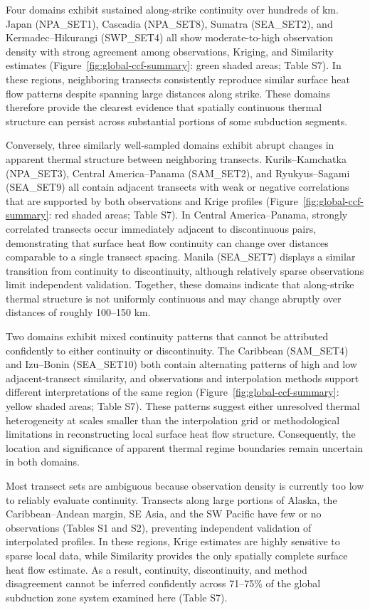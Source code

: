 \documentclass[draft,linenumbers]{agujournal2019}
\begin{document}
Four domains exhibit sustained along-strike continuity over hundreds of
km. Japan (NPA\_SET1), Cascadia (NPA\_SET8), Sumatra (SEA\_SET2), and
Kermadec--Hikurangi (SWP\_SET4) all show moderate-to-high observation
density with strong agreement among observations, Kriging, and
Similarity estimates (Figure~\ref{fig:global-ccf-summary}: green shaded
areas; Table S7). In these regions, neighboring transects consistently
reproduce similar surface heat flow patterns despite spanning large
distances along strike. These domains therefore provide the clearest
evidence that spatially continuous thermal structure can persist across
substantial portions of some subduction segments.

Conversely, three similarly well-sampled domains exhibit abrupt changes
in apparent thermal structure between neighboring transects.
Kurils--Kamchatka (NPA\_SET3), Central America--Panama (SAM\_SET2), and
Ryukyus--Sagami (SEA\_SET9) all contain adjacent transects with weak or
negative correlations that are supported by both observations and Krige
profiles (Figure~\ref{fig:global-ccf-summary}: red shaded areas; Table
S7). In Central America--Panama, strongly correlated transects occur
immediately adjacent to discontinuous pairs, demonstrating that surface
heat flow continuity can change over distances comparable to a single
transect spacing. Manila (SEA\_SET7) displays a similar transition from
continuity to discontinuity, although relatively sparse observations
limit independent validation. Together, these domains indicate that
along-strike thermal structure is not uniformly continuous and may
change abruptly over distances of roughly 100--150 km.

Two domains exhibit mixed continuity patterns that cannot be attributed
confidently to either continuity or discontinuity. The Caribbean
(SAM\_SET4) and Izu--Bonin (SEA\_SET10) both contain alternating
patterns of high and low adjacent-transect similarity, and observations
and interpolation methods support different interpretations of the same
region (Figure~\ref{fig:global-ccf-summary}: yellow shaded areas; Table
S7). These patterns suggest either unresolved thermal heterogeneity at
scales smaller than the interpolation grid or methodological limitations
in reconstructing local surface heat flow structure. Consequently, the
location and significance of apparent thermal regime boundaries remain
uncertain in both domains.

Most transect sets are ambiguous because observation density is
currently too low to reliably evaluate continuity. Transects along large
portions of Alaska, the Caribbean--Andean margin, SE Asia, and the SW
Pacific have few or no observations (Tables S1 and S2), preventing
independent validation of interpolated profiles. In these regions, Krige
estimates are highly sensitive to sparse local data, while Similarity
provides the only spatially complete surface heat flow estimate. As a
result, continuity, discontinuity, and method disagreement cannot be
inferred confidently across 71--75\% of the global subduction zone
system examined here (Table S7).
\end{document}
